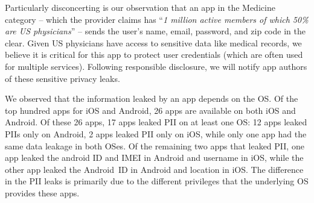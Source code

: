 Particularly disconcerting is our observation that an app in the Medicine category -- which the provider claims has ``\emph{1 million active members of which 50\% are US physicians}'' -- sends the user's name, email, password, and zip code in the clear. 
Given US physicians have access to sensitive data like medical records, we believe it is critical for this app to protect user credentials (which are often used for multiple services). 
Following responsible disclosure, we will notify app authors of these sensitive privacy leaks. 

We observed that the information leaked by an app depends on the OS.
Of the top hundred apps for iOS and Android, 26 apps are available on both iOS and Android. 
Of these 26 apps, 17 apps leaked PII on at least one OS: 12 apps leaked PIIs only on Android, 2 apps leaked PII only on iOS, while only one app had the same data leakage in both OSes.
Of the remaining two apps that leaked PII, one app leaked the android ID and IMEI in Android and username in iOS, while the other app leaked the Android~ID in Android and location in iOS. 
The difference in the PII leaks is primarily due to the different privileges that the underlying OS provides these apps. 


